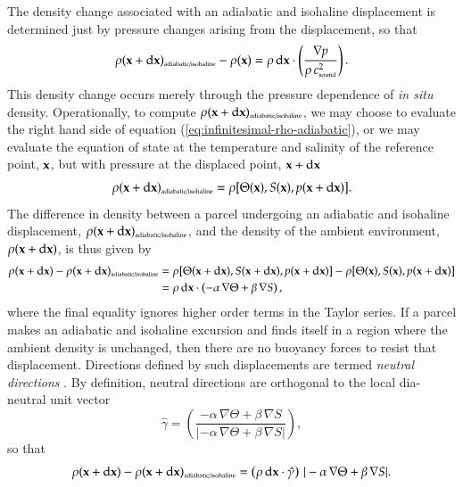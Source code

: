 The density change associated with an adiabatic and isohaline
displacement is determined just by pressure changes arising from the
displacement, so that
\begin{equation}
\rho({\bf x} + \mathrm{d} {\bf x})_{\mbox{\tiny  adiabatic/isohaline}} - \rho({\bf x})  =
  \rho \, \mathrm{d}{\bf x} \cdot  \left( \frac{ \nabla p }{\rho \, c_{\mbox{\tiny sound}}^{2}  } \right).
\label{eq:infinitesimal-rho-adiabatic}
\end{equation}
This density change occurs merely through the pressure dependence of
{\it in situ} density.  Operationally, to compute $\rho({\bf x} +
\mathrm{d} {\bf x})_{\mbox{\tiny adiabatic/isohaline}}$, we may choose
to evaluate the right hand side of equation
(\ref{eq:infinitesimal-rho-adiabatic}), or we may evaluate the
equation of state at the temperature and salinity of the reference
point, ${\bf x}$, but with pressure at the displaced point, ${\bf x} +
\mathrm{d} {\bf x}$
\begin{equation}
  \rho({\bf x} + \mathrm{d} {\bf x})_{\mbox{\tiny adiabatic/isohaline}} 
 = \rho[ \Theta({\bf x}), S({\bf x}), p({\bf x}  + \mathrm{d} {\bf x})]. 
\end{equation}
The difference in density between a parcel undergoing an adiabatic and
isohaline displacement, $\rho({\bf x} + \mathrm{d} {\bf x})_{\mbox{\tiny
    adiabatic/isohaline}}$, and the density of the ambient environment,
$\rho({\bf x} + \mathrm{d} {\bf x})$, is thus given by
\begin{subequations}
\begin{align}
\rho({\bf x} + \mathrm{d} {\bf x})  - \rho({\bf x} + \mathrm{d} {\bf x})_{\mbox{\tiny  adiabatic/isohaline}} 
&=
\rho[ \Theta({\bf x} + \mathrm{d} {\bf x}), S({\bf x} + \mathrm{d} {\bf x}), p({\bf x} + \mathrm{d} {\bf x})]
-
\rho[ \Theta({\bf x} ), S({\bf x}), p({\bf x} + \mathrm{d} {\bf x})]
\\
&=
  \rho \, \mathrm{d}{\bf x} \cdot 
  \left( -\alpha \, \nabla \Theta + \beta \, \nabla  S \right),
\end{align}
\label{eq:neutral-directions-motivated}
\end{subequations}
where the final equality ignores higher order terms in the Taylor
series.  If a parcel makes an adiabatic and isohaline excursion and
finds itself in a region where the ambient density is unchanged, then
there are no buoyancy forces to resist that displacement.  Directions
defined by such displacements are termed {\it neutral directions}
\citep{McDougall1987a}.  By definition, neutral directions are
orthogonal to the local dia-neutral unit vector
\begin{equation}
 \hat{\gamma} = \left( \frac{-\alpha \, \nabla \Theta + \beta \, \nabla S}
                          {|-\alpha \, \nabla \Theta + \beta \, \nabla S|}
 \right),
\end{equation}
 so that 
\begin{equation}
\rho({\bf x} + \mathrm{d} {\bf x})  - \rho({\bf x} + \mathrm{d} {\bf x})_{\mbox{\tiny  adiabatic/isohaline}} 
 = 
 \left( \rho \, \mathrm{d}{\bf x} \cdot \hat{\gamma} \right) \, 
 |-\alpha \, \nabla \Theta + \beta \, \nabla  S |. 
\end{equation}


